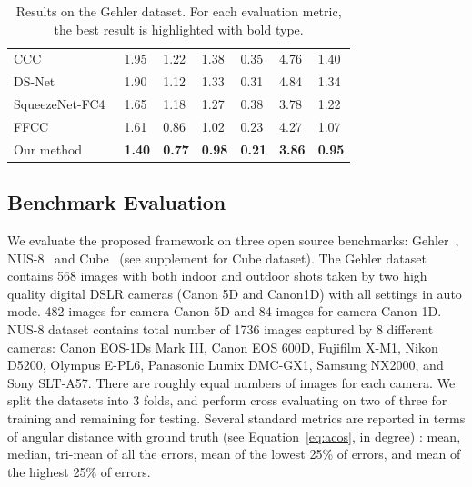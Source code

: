 \documentclass[10pt,twocolumn,letterpaper]{article}
\begin{document}
\begin{table}[b]
{\begin{tabular}{l|llllll}
CCC~\cite{barron2015convolutional}& 1.95 & 1.22 & 1.38 & 0.35 & 4.76 & 1.40\\
DS-Net~\cite{shi2016deep}& 1.90 & 1.12 & 1.33 & 0.31 & 4.84 & 1.34\\
SqueezeNet-FC4~\cite{hu2017fc}& 1.65 & 1.18 & 1.27 & 0.38 & 3.78 & 1.22\\
FFCC~\cite{DBLP:journals/corr/BarronT16}& 1.61 & 0.86 & 1.02 & 0.23 & 4.27 & 1.07\\
\hline
Our method & \textbf{1.40} & \textbf{0.77} & \textbf{0.98} & \textbf{0.21} & \textbf{3.86} & \textbf{0.95} \\
\hline
\end{tabular}
}
\caption{Results on the Gehler dataset.
For each evaluation metric, the best result is highlighted with bold type.}
\label{table_gehler}
\end{table}

\subsection{Benchmark Evaluation}
\label{subsection_benchmarks}

We evaluate the proposed framework on three open source benchmarks: Gehler~\cite{gehler2008bayesian},
NUS-8~\cite{cheng2014illuminant} and Cube~\cite{DBLP:journals/corr/abs-1712-00436} (see supplement for Cube dataset).
The Gehler dataset contains 568 images with both indoor and
outdoor shots taken by two high quality digital DSLR cameras (Canon 5D and Canon1D) with all settings in auto mode.
482 images for camera Canon 5D and 84 images for camera Canon 1D.
NUS-8 dataset contains total number of 1736 images captured by 8 different cameras: Canon EOS-1Ds Mark III,
Canon EOS 600D, Fujifilm X-M1, Nikon D5200, Olympus E-PL6, Panasonic Lumix DMC-GX1, Samsung NX2000, and Sony SLT-A57.
There are roughly equal numbers of images for each camera.
We split the datasets into 3 folds, and perform cross evaluating on two of three for training and remaining for testing.
Several standard metrics are reported in terms of angular distance with ground truth (see Equation~\ref{eq:acos}, in degree) :
mean, median, tri-mean of all the errors,
mean of the lowest 25\% of errors, and mean of the highest 25\% of errors.
\end{document}
